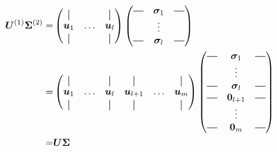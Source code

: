     \begin{align}
        \bm{U}^{(1)} \bm{\Sigma}^{(2)} =&
        \begin{pmatrix}
        \vertbar &        & \vertbar \\
        \bm{u}_1 & \hdots & \bm{u}_l \\
        \vertbar &        & \vertbar 
        \end{pmatrix}
        \begin{pmatrix}
            \horzbar & \bm{\sigma}_1     & \horzbar \\
                     & \vdots            &          \\
            \horzbar & \bm{\sigma}_l     & \horzbar \\
        \end{pmatrix} \\
        =&\begin{pmatrix}
            \vertbar &        & \vertbar & \vertbar &        & \vertbar \\
            \bm{u}_1 & \hdots & \bm{u}_l & \bm{u}_{l+1} & \hdots & \bm{u}_m \\
            \vertbar &        & \vertbar & \vertbar &        & \vertbar \\
            \end{pmatrix}
            \begin{pmatrix}
                \horzbar & \bm{\sigma}_1     & \horzbar  \\
                         & \vdots            &           \\
                \horzbar & \bm{\sigma}_l     &  \horzbar \\
                \horzbar & \bm{0}_{l+1} & \horzbar  \\
                         & \vdots            &           \\
                \horzbar & \bm{0}_m     &  \horzbar \\
        \end{pmatrix} \\
        =& \bm{U \Sigma}
    \end{align}
    \allowdisplaybreaks
    
